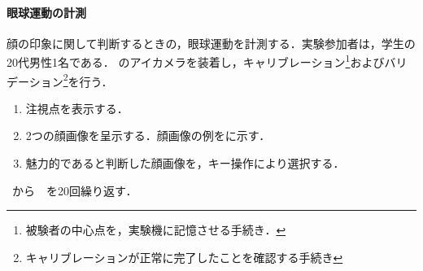 \paragraph{眼球運動の計測}
顔の印象に関して判断するときの，眼球運動を計測する．実験参加者は，学生の20代男性1名である．
\elt のアイカメラを装着し，キャリブレーション\footnote{被験者の中心点を，実験機に記憶させる手続き．}およびバリデーション\footnote{キャリブレーションが正常に完了したことを確認する手続き}を行う．
\begin{enumerate}
    \renewcommand{\labelenumi}{\fbox{\theenumi}}
    \item 注視点を表示する．
    \item 2つの顔画像を呈示する．顔画像の例をに示す．
    \item 魅力的であると判断した顔画像を，キー操作により選択する．
\end{enumerate}
\ から\ \ を20回繰り返す．
